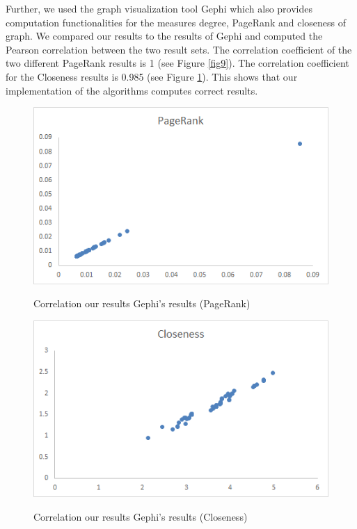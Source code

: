 Further, we used the graph visualization tool Gephi which also provides computation functionalities for the measures degree, PageRank and closeness of graph. We compared our results to the results of Gephi and computed the Pearson correlation between the two result sets.
The correlation coefficient of the two different PageRank results is 1 (see Figure \ref{fig9}). The correlation coefficient for the Closeness results is 0.985 (see Figure \ref{fig10}). This shows that our implementation of the algorithms computes correct results.

\begin{figure}[H]
\begin{minipage}{.5\textwidth}
	\begin{center}
		\label{fig9}		
		\includegraphics[width=1.0\textwidth]{fig9}	
		\caption{Correlation our results Gephi’s results (PageRank)}	
	\end{center}
\end{minipage} %
\begin{minipage}{.5\textwidth}
	\begin{center}
		\label{fig10}		
		\includegraphics[width=1.0\textwidth]{fig10}	
		\caption{Correlation our results Gephi’s results (Closeness)}	
	\end{center}
\end{minipage}
\end{figure}

